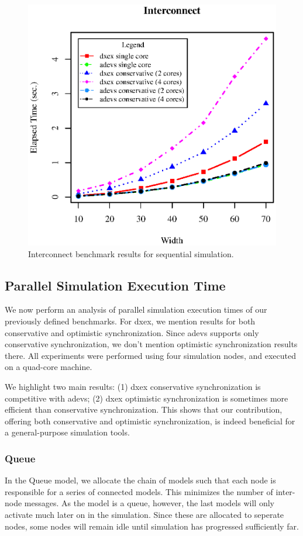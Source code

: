 \begin{figure}
	\includegraphics[width=\columnwidth]{fig/fig3.eps}
	\caption{Interconnect benchmark results for sequential simulation.}
	\label{fig:Interconnect_benchmark}
\end{figure}

\subsection{Parallel Simulation Execution Time}
We now perform an analysis of parallel simulation execution times of our previously defined benchmarks.
For dxex, we mention results for both conservative and optimistic synchronization.
Since adevs supports only conservative synchronization, we don't mention optimistic synchronization results there.
All experiments were performed using four simulation nodes, and executed on a quad-core machine.

We highlight two main results:
(1) dxex conservative synchronization is competitive with adevs;
(2) dxex optimistic synchronization is sometimes more efficient than conservative synchronization.
This shows that our contribution, offering both conservative and optimistic synchronization, is indeed beneficial for a general-purpose simulation tools.

\subsubsection{Queue}
In the Queue model, we allocate the chain of models such that each node is responsible for a series of connected models.
This minimizes the number of inter-node messages.
As the model is a queue, however, the last models will only activate much later on in the simulation.
Since these are allocated to seperate nodes, some nodes will remain idle until simulation has progressed sufficiently far.

